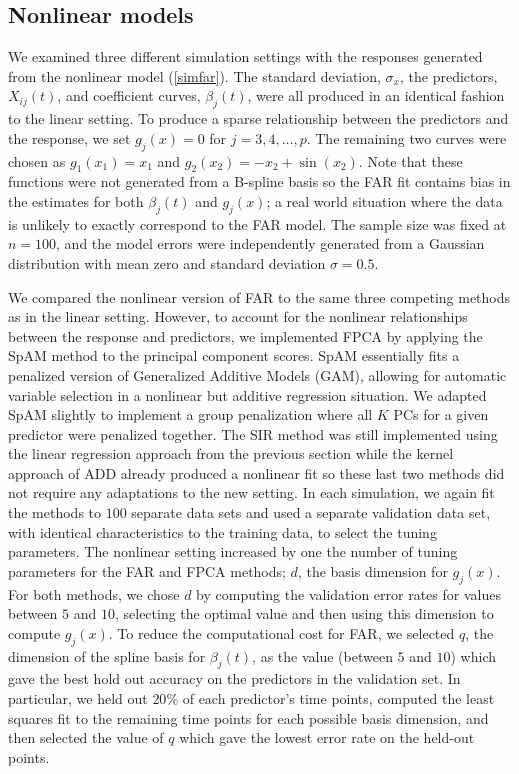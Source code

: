 \documentclass[aos,MSNbibl,dvips]{arximspdf}
\begin{document}
\subsection{Nonlinear models}
\label{nonlinear}
We examined three different simulation settings with the responses
generated from the nonlinear model (\ref{simfar}). The standard
deviation, $\sigma_x$, the predictors, $X_{ij}(t)$, and coefficient
curves, $\beta_j(t)$, were all produced in an
identical fashion to the linear setting. To produce a sparse
relationship between the predictors and the response, we set $g_j(x)=0$
for $j=3,4,\ldots, p$. The remaining two curves were chosen as
$g_1(x_1)=x_1$ and $g_2(x_2)=-x_2+\sin(x_2)$. Note that these
functions were not generated from a B-spline basis so the FAR fit
contains bias in the estimates for both $\beta_j(t)$ and $g_j(x)$; a
real world situation where the data is unlikely to exactly correspond
to the FAR model. The sample size was fixed at $n=100$, and the model
errors were independently generated from a Gaussian distribution with
mean zero and standard deviation $\sigma=0.5$.

We compared the nonlinear version of FAR to the same three competing
methods as in the linear setting. However, to account for the
nonlinear relationships between the response and predictors, we
implemented FPCA by applying the SpAM method \cite{ravikumar1} to
the principal component scores. SpAM essentially fits a penalized
version of Generalized Additive Models (GAM), allowing for automatic
variable selection in a nonlinear but additive regression situation.
We adapted SpAM slightly to implement a group penalization where all
$K$ PCs for a given predictor were penalized together. The SIR method
was still implemented using the linear regression approach from the
previous section while the kernel approach of ADD already produced a
nonlinear fit so these last two methods did not require any
adaptations to the new setting. In each simulation, we again fit the
methods to $100$ separate data sets and used a separate validation data
set, with identical
characteristics to the training data, to select the tuning parameters.
The nonlinear setting increased by one the number of tuning parameters
for the FAR and FPCA methods; $d$, the basis dimension for $g_j(x)$.
For both methods, we chose $d$ by computing the validation error rates
for values between $5$ and $10$, selecting the optimal value and then
using this dimension to compute $g_j(x)$. To reduce the computational
cost for FAR, we selected $q$, the dimension of the spline basis for
$\beta_j(t)$, as the value (between $5$ and $10$) which gave the best
hold out accuracy on the predictors in the validation set. In
particular, we held out $20\%$ of each predictor's time points,
computed the least squares fit to the remaining time points for each
possible basis dimension, and then selected the value of $q$ which gave
the lowest error rate on the held-out points.
\end{document}
